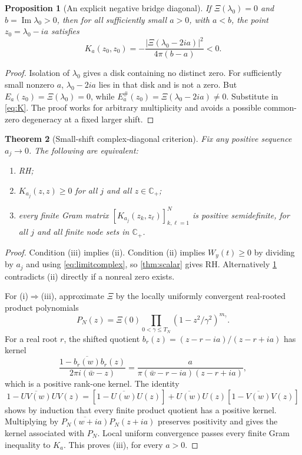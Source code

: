 \documentclass[11pt,letterpaper]{article}
\numberwithin{equation}{section}
\newtheorem{theorem}{Theorem}[section]
\newtheorem{proposition}[theorem]{Proposition}
\theoremstyle{definition}
\theoremstyle{remark}
\newcommand{\Cp}{\mathbb C_+}
\newcommand{\Impart}{\operatorname{Im}}
\begin{document}
\begin{proposition}[An explicit negative bridge diagonal]\label{prop:kernelwitness}
If $\Xi(\lambda_0)=0$ and $b=\Impart\lambda_0>0$, then for all sufficiently small $a>0$, with $a<b$, the point $z_0=\lambda_0-ia$ satisfies
\begin{equation}\label{eq:kernelwitness}
K_a(z_0,z_0)
=-\frac{|\Xi(\lambda_0-2ia)|^2}{4\pi(b-a)}<0.
\end{equation}
\end{proposition}
\begin{proof}
Isolation of $\lambda_0$ gives a disk containing no distinct zero. For sufficiently small nonzero $a$, $\lambda_0-2ia$ lies in that disk and is not a zero. But $E_a(z_0)=\Xi(\lambda_0)=0$, while $E_a^\#(z_0)=\Xi(\lambda_0-2ia)\ne0$. Substitute in \eqref{eq:K}. The proof works for arbitrary multiplicity and avoids a possible common-zero degeneracy at a fixed larger shift.
\end{proof}

\begin{theorem}[Small-shift complex-diagonal criterion]\label{thm:sequence}
Fix any positive sequence $a_j\to0$. The following are equivalent:
\begin{enumerate}[label=(\roman*)]
\item RH;
\item $K_{a_j}(z,z)\ge0$ for all $j$ and all $z\in\Cp$;
\item every finite Gram matrix $[K_{a_j}(z_k,z_\ell)]_{k,\ell=1}^N$ is positive semidefinite, for all $j$ and all finite node sets in $\Cp$.
\end{enumerate}
\end{theorem}
\begin{proof}
Condition (iii) implies (ii). Condition (ii) implies $W_y(t)\ge0$ by dividing by $a_j$ and using \eqref{eq:limitcomplex}, so \cref{thm:scalar} gives RH. Alternatively \cref{prop:kernelwitness} contradicts (ii) directly if a nonreal zero exists.

For (i)$\Rightarrow$(iii), approximate $\Xi$ by the locally uniformly convergent real-rooted product polynomials
\[
P_N(z)=\Xi(0)\prod_{0<\gamma\le T_N}(1-z^2/\gamma^2)^{m_\gamma}.
\]
For a real root $r$, the shifted quotient $b_r(z)=(z-r-ia)/(z-r+ia)$ has kernel
\[
\frac{1-\overline{b_r(w)}b_r(z)}{2\pi i(\bar w-z)}
=\frac{a}{\pi(\bar w-r-ia)(z-r+ia)},
\]
which is a positive rank-one kernel. The identity
\[
1-\overline{UV(w)}UV(z)
=[1-\overline{U(w)}U(z)]
+\overline{U(w)}U(z)[1-\overline{V(w)}V(z)]
\]
shows by induction that every finite product quotient has a positive kernel. Multiplying by $\overline{P_N(w+ia)}P_N(z+ia)$ preserves positivity and gives the kernel associated with $P_N$. Local uniform convergence passes every finite Gram inequality to $K_a$. This proves (iii), for every $a>0$.
\end{proof}
\end{document}
